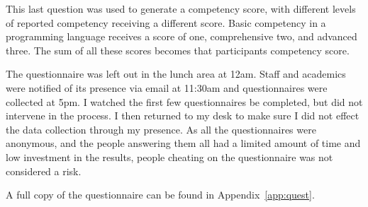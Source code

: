 This last question was used to generate a competency score, with different levels of reported competency receiving a different score. Basic competency in a programming language receives a score of one, comprehensive two, and advanced three. The sum of all these scores becomes that participants competency score.

The questionnaire was left out in the lunch area at 12am. Staff and academics were notified of its presence via email at 11:30am and questionnaires were collected at 5pm. I watched the first few questionnaires be completed, but did not intervene in the process. I then returned to my desk to make sure I did not effect the data collection through my presence. As all the questionnaires were anonymous, and the people answering them all had a limited amount of time and low investment in the results, people cheating on the questionnaire was not considered a risk. 

A full copy of the questionnaire can be found in Appendix~\ref{app:quest}.
